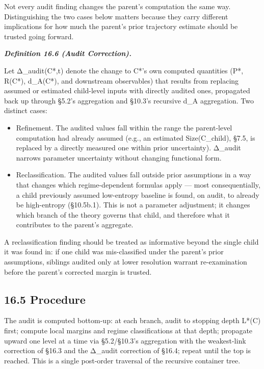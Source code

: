 \documentclass[
]{article}
\begin{document}
Not every audit finding changes the parent's computation the same way.
Distinguishing the two cases below matters because they carry different
implications for how much the parent's prior trajectory estimate should
be trusted going forward.

\emph{\textbf{Definition 16.6 (Audit Correction).}}

Let Δ\_audit(C*,t) denote the change to C*'s own computed quantities
(P*, R(C*), d\_A(C*), and downstream observables) that results from
replacing assumed or estimated child-level inputs with directly audited
ones, propagated back up through §5.2's aggregation and §10.3's
recursive d\_A aggregation. Two distinct cases:

\begin{itemize}
\item
  Refinement. The audited values fall within the range the parent-level
  computation had already assumed (e.g., an estimated Size(C\_child),
  §7.5, is replaced by a directly measured one within prior
  uncertainty). Δ\_audit narrows parameter uncertainty without changing
  functional form.
\item
  Reclassification. The audited values fall outside prior assumptions in
  a way that changes which regime-dependent formulas apply --- most
  consequentially, a child previously assumed low-entropy baseline is
  found, on audit, to already be high-entropy (§10.5b.1). This is not a
  parameter adjustment; it changes which branch of the theory governs
  that child, and therefore what it contributes to the parent's
  aggregate.
\end{itemize}

A reclassification finding should be treated as informative beyond the
single child it was found in: if one child was mis-classified under the
parent's prior assumptions, siblings audited only at lower resolution
warrant re-examination before the parent's corrected margin is trusted.

\hypertarget{procedure}{%
\subsection{16.5 Procedure}\label{procedure}}

The audit is computed bottom-up: at each branch, audit to stopping depth
L*(C) first; compute local margins and regime classifications at that
depth; propagate upward one level at a time via §5.2/§10.3's aggregation
with the weakest-link correction of §16.3 and the Δ\_audit correction of
§16.4; repeat until the top is reached. This is a single post-order
traversal of the recursive container tree.
\end{document}
